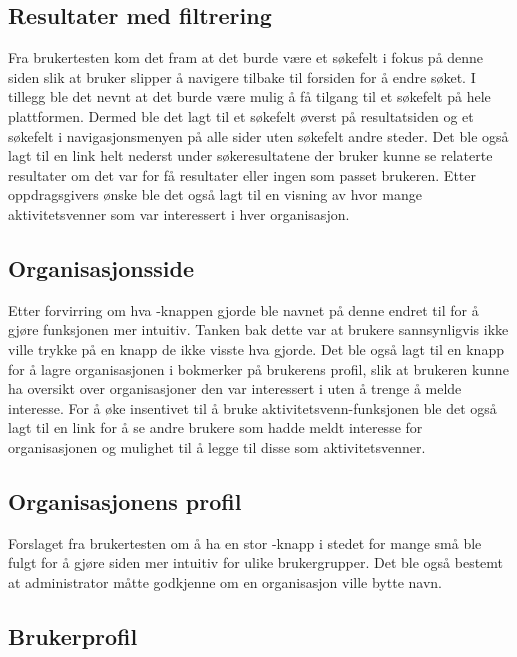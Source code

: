 \subsection{Resultater med filtrering}

Fra brukertesten kom det fram at det burde være et søkefelt i fokus på denne siden slik at bruker slipper å navigere tilbake til forsiden for å endre søket. I tillegg ble det nevnt at det burde være mulig å få tilgang til et søkefelt på hele plattformen. Dermed ble det lagt til et søkefelt øverst på resultatsiden og et søkefelt i navigasjonsmenyen på alle sider uten søkefelt andre steder. Det ble også lagt til en link helt nederst under søkeresultatene der bruker kunne se relaterte resultater om det var for få resultater eller ingen som passet brukeren. Etter oppdragsgivers ønske ble det også lagt til en visning av hvor mange aktivitetsvenner som var interessert i hver organisasjon.

\subsection{Organisasjonsside}

Etter forvirring om hva -knappen gjorde ble navnet på denne endret til  for å gjøre funksjonen mer intuitiv. Tanken bak dette var at brukere sannsynligvis ikke ville trykke på en knapp de ikke visste hva gjorde. Det ble også lagt til en knapp for å lagre organisasjonen i bokmerker på brukerens profil, slik at brukeren kunne ha oversikt over organisasjoner den var interessert i uten å trenge å melde interesse. For å øke insentivet til å bruke aktivitetsvenn-funksjonen ble det også lagt til en link for å se andre brukere som hadde meldt interesse for organisasjonen og mulighet til å legge til disse som aktivitetsvenner.

\subsection{Organisasjonens profil}

Forslaget fra brukertesten om å ha en stor -knapp i stedet for mange små ble fulgt for å gjøre siden mer intuitiv for ulike brukergrupper. Det ble også bestemt at administrator måtte godkjenne om en organisasjon ville bytte navn.

\subsection{Brukerprofil}
 
